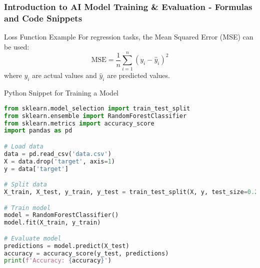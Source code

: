 \documentclass[aspectratio=169]{beamer}
\begin{document}
\begin{frame}[fragile]
    \frametitle{Introduction to AI Model Training \& Evaluation - Formulas and Code Snippets}

    \begin{block}{Loss Function Example}
        For regression tasks, the Mean Squared Error (MSE) can be used:
        \begin{equation}
        \text{MSE} = \frac{1}{n} \sum_{i=1}^{n} (y_{i} - \hat{y}_{i})^2
        \end{equation}
        where \( y_{i} \) are actual values and \( \hat{y}_{i} \) are predicted values.
    \end{block}

    \begin{block}{Python Snippet for Training a Model}
        \begin{lstlisting}[language=Python]
from sklearn.model_selection import train_test_split
from sklearn.ensemble import RandomForestClassifier
from sklearn.metrics import accuracy_score
import pandas as pd

# Load data
data = pd.read_csv('data.csv')
X = data.drop('target', axis=1)
y = data['target']

# Split data
X_train, X_test, y_train, y_test = train_test_split(X, y, test_size=0.2)

# Train model
model = RandomForestClassifier()
model.fit(X_train, y_train)

# Evaluate model
predictions = model.predict(X_test)
accuracy = accuracy_score(y_test, predictions)
print(f'Accuracy: {accuracy}')
        \end{lstlisting}
    \end{block}
    
\end{frame}
\end{document}
